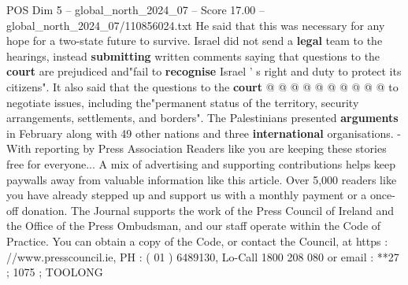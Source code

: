 \begin{textsample}{POS Dim 5 – global\_north\_2024\_07 – Score 17.00 – global\_north\_2024\_07/110856024.txt}
He said that this was necessary for any hope for a two-state future to survive.
Israel did not send a \textbf{legal} team to the hearings, instead \textbf{submitting} written comments saying that questions to the \textbf{court} are prejudiced and"fail to \textbf{recognise} Israel ' s right and duty to protect its citizens".
It also said that the questions to the \textbf{court} @ @ @ @ @ @ @ @ @ @ to negotiate issues, including the"permanent status of the territory, security arrangements, settlements, and borders".
The Palestinians presented \textbf{arguments} in February along with 49 other nations and three \textbf{international} organisations. -With reporting by Press Association Readers like you are keeping these stories free for everyone...
A mix of advertising and supporting contributions helps keep paywalls away from valuable information like this article.
Over 5,000 readers like you have already stepped up and support us with a monthly payment or a once-off donation.
The Journal supports the work of the Press Council of Ireland and the Office of the Press Ombudsman, and our staff operate within the Code of Practice.
You can obtain a copy of the Code, or contact the Council, at https : //www.presscouncil.ie, PH : ( 01 ) 6489130, Lo-Call 1800 208 080 or email : **27 ; 1075 ; TOOLONG

\end{textsample}
